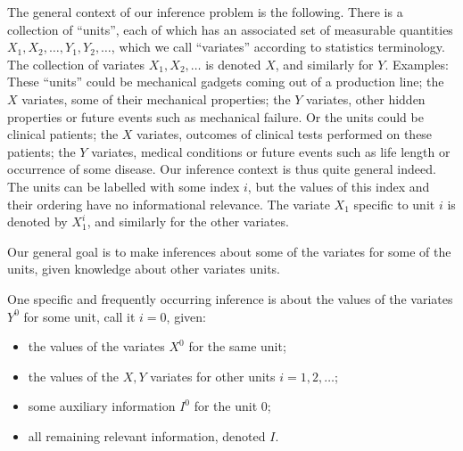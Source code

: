 \documentclass[a4paper,12pt,%
onecolumn,oneside,article,%
british%
]{memoir}
\renewcommand*{\|}[1][]{\nonscript\:#1\vert\nonscript\:\mathopen{}}
\begin{document}
The general context of our inference problem is the following. There is a collection of \enquote{units}, each of which has an associated set of measurable quantities $X_{1},X_{2},\dotsc,Y_{1},Y_{2},\dotsc$, which we call \enquote{variates} according to statistics terminology. The collection of variates $X_{1},X_{2},\dotsc$ is denoted $X$, and similarly for $Y$. %
Examples: These \enquote{units} could be mechanical gadgets coming out of a production line; the $X$ variates, some of their mechanical properties; the $Y$ variates, other hidden properties or future events such as mechanical failure. Or the units could be clinical patients; the $X$ variates, outcomes of clinical tests performed on these patients; the $Y$ variates, medical conditions or future events such as life length or occurrence of some disease. Our inference context is thus quite general indeed. The units can be labelled with some index $i$, but the values of this index and their ordering have no informational relevance. The variate $X_{1}$ specific to unit $i$ is denoted by $X^{i}_{1}$, and similarly for the other variates.

Our general goal is to make inferences about some of the variates for some of the units, given knowledge about other variates units.

One specific and frequently occurring inference is about the values of the variates $Y^{0}$ for some unit, call it $i=0$, given:
\begin{itemize}%
\item the values of the variates $X^{0}$ for the same unit; \item the values of the $X,Y$ variates for other units $i=1,2,\dotsc$; \item some auxiliary information $I^{0}$ for the unit $0$; \item all remaining relevant information, denoted $I$.
\end{itemize}
\end{document}
